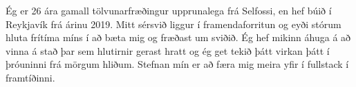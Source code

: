 \documentclass[a4paper,12pt]{memoir} %
\begin{document}
\userinformation %

\framebreak %





{Ég er 26 ára gamall tölvunarfræðingur upprunalega frá Selfossi, en hef búið í Reykjavík frá árinu 2019. Mitt sérsvið liggur í framendaforritun og eyði stórum hluta frítíma míns í að bæta mig og fræðast um sviðið. Ég hef mikinn áhuga á að vinna á stað þar sem hlutirnir gerast hratt og ég get tekið þátt virkan þátt í þróuninni frá mörgum hliðum. Stefnan mín er að færa mig meira yfir í fullstack í framtíðinni.}






\Sep %



\end{document}
